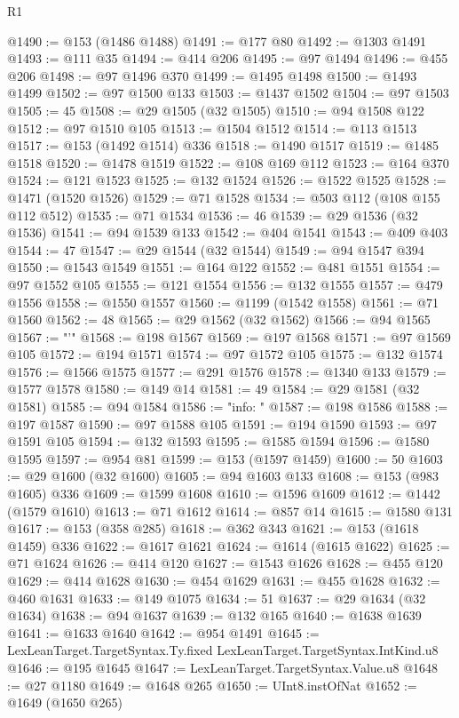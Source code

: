 \begin{lexlean}{R1}
\begin{coremodule}
@1490 := @153 (@1486 @1488)
@1491 := @177 @80
@1492 := @1303 @1491
@1493 := @111 @35
@1494 := @414 @206
@1495 := @97 @1494
@1496 := @455 @206
@1498 := @97 @1496 @370
@1499 := @1495 @1498
@1500 := @1493 @1499
@1502 := @97 @1500 @133
@1503 := @1437 @1502
@1504 := @97 @1503
@1505 := 45
@1508 := @29 @1505 (@32 @1505)
@1510 := @94 @1508 @122
@1512 := @97 @1510 @105
@1513 := @1504 @1512
@1514 := @113 @1513
@1517 := @153 (@1492 @1514) @336
@1518 := @1490 @1517
@1519 := @1485 @1518
@1520 := @1478 @1519
@1522 := @108 @169 @112
@1523 := @164 @370
@1524 := @121 @1523
@1525 := @132 @1524
@1526 := @1522 @1525
@1528 := @1471 (@1520 @1526)
@1529 := @71 @1528
@1534 := @503 @112 (@108 @155 @112 @512)
@1535 := @71 @1534
@1536 := 46
@1539 := @29 @1536 (@32 @1536)
@1541 := @94 @1539 @133
@1542 := @404 @1541
@1543 := @409 @403
@1544 := 47
@1547 := @29 @1544 (@32 @1544)
@1549 := @94 @1547 @394
@1550 := @1543 @1549
@1551 := @164 @122
@1552 := @481 @1551
@1554 := @97 @1552 @105
@1555 := @121 @1554
@1556 := @132 @1555
@1557 := @479 @1556
@1558 := @1550 @1557
@1560 := @1199 (@1542 @1558)
@1561 := @71 @1560
@1562 := 48
@1565 := @29 @1562 (@32 @1562)
@1566 := @94 @1565
@1567 := "'"
@1568 := @198 @1567
@1569 := @197 @1568
@1571 := @97 @1569 @105
@1572 := @194 @1571
@1574 := @97 @1572 @105
@1575 := @132 @1574
@1576 := @1566 @1575
@1577 := @291 @1576
@1578 := @1340 @133
@1579 := @1577 @1578
@1580 := @149 @14
@1581 := 49
@1584 := @29 @1581 (@32 @1581)
@1585 := @94 @1584
@1586 := "info: "
@1587 := @198 @1586
@1588 := @197 @1587
@1590 := @97 @1588 @105
@1591 := @194 @1590
@1593 := @97 @1591 @105
@1594 := @132 @1593
@1595 := @1585 @1594
@1596 := @1580 @1595
@1597 := @954 @81
@1599 := @153 (@1597 @1459)
@1600 := 50
@1603 := @29 @1600 (@32 @1600)
@1605 := @94 @1603 @133
@1608 := @153 (@983 @1605) @336
@1609 := @1599 @1608
@1610 := @1596 @1609
@1612 := @1442 (@1579 @1610)
@1613 := @71 @1612
@1614 := @857 @14
@1615 := @1580 @131
@1617 := @153 (@358 @285)
@1618 := @362 @343
@1621 := @153 (@1618 @1459) @336
@1622 := @1617 @1621
@1624 := @1614 (@1615 @1622)
@1625 := @71 @1624
@1626 := @414 @120
@1627 := @1543 @1626
@1628 := @455 @120
@1629 := @414 @1628
@1630 := @454 @1629
@1631 := @455 @1628
@1632 := @460 @1631
@1633 := @149 @1075
@1634 := 51
@1637 := @29 @1634 (@32 @1634)
@1638 := @94 @1637
@1639 := @132 @165
@1640 := @1638 @1639
@1641 := @1633 @1640
@1642 := @954 @1491
@1645 := LexLeanTarget.TargetSyntax.Ty.fixed LexLeanTarget.TargetSyntax.IntKind.u8
@1646 := @195 @1645
@1647 := LexLeanTarget.TargetSyntax.Value.u8
@1648 := @27 @1180
@1649 := @1648 @265
@1650 := UInt8.instOfNat
@1652 := @1649 (@1650 @265)

\end{coremodule}
\end{lexlean}
